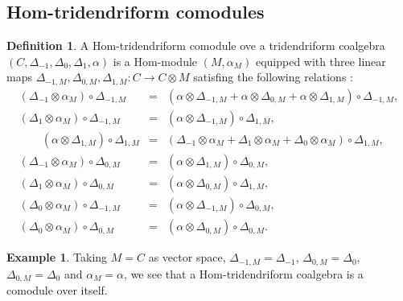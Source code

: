 \documentclass{article}
\theoremstyle{definition}
\newtheorem{defn}[thm]{Definition}
\newtheorem{exam}[thm]{Example}
\theoremstyle{remark}
\numberwithin{equation}{section}
\begin{document}
 \subsection{Hom-tridendriform comodules}
 \begin{defn}\label{}
 A Hom-tridendriform comodule ove a tridendriform coalgebra $(C, \Delta_{-1}, \Delta_{0}, \Delta_1, \alpha)$ is a Hom-module $(M, \alpha_M)$
  equipped with three linear maps 
 $\Delta_{-1, M}, \Delta_{0, M}, \Delta_{1, M} : C\rightarrow C\otimes M$ satisfing the  following relations :
  \begin{eqnarray}
   (\Delta_{-1}\otimes\alpha_M)\circ\Delta_{-1, M}&=&(\alpha\otimes\Delta_{-1, M}+\alpha\otimes\Delta_{0, M}
 +\alpha\otimes\Delta_{1, M})\circ\Delta_{-1, M},\\
 (\Delta_1\otimes\alpha_M)\circ\Delta_{-1, M}&=&(\alpha\otimes\Delta_{-1, M})\circ\Delta_{1, M},\label{cc2}\\
 \qquad(\alpha\otimes\Delta_{1, M})\circ\Delta_{1, M}&=&(\Delta_{-1}\otimes\alpha_M+\Delta_1\otimes\alpha_M+\Delta_0\otimes\alpha_M)\circ\Delta_{1, M},\\
 (\Delta_{-1}\otimes\alpha_M)\circ\Delta_{0, M}&=&(\alpha\otimes\Delta_{1, M})\circ\Delta_{0, M},\\
 (\Delta_1\otimes\alpha_M)\circ\Delta_{0, M}&=&(\alpha\otimes\Delta_{0, M})\circ\Delta_{1, M},\\
 (\Delta_0\otimes\alpha_M)\circ\Delta_{-1, M}&=&(\alpha\otimes\Delta_{-1, M})\circ\Delta_{0, M},\label{cc6}\\
 (\Delta_0\otimes\alpha_M)\circ\Delta_{0, M}&=&(\alpha\otimes\Delta_{0, M})\circ\Delta_{0, M}.
  \end{eqnarray}
 \end{defn}
 \begin{exam}
  Taking $M=C$ as vector space, $\Delta_{-1, M}=\Delta_{-1}$, $\Delta_{0, M}=\Delta_{0}$, $\Delta_{0, M}=\Delta_{0}$ and 
$\alpha_M=\alpha$, we see that a Hom-tridendriform coalgebra is a comodule over itself.
 \end{exam}
\end{document}
